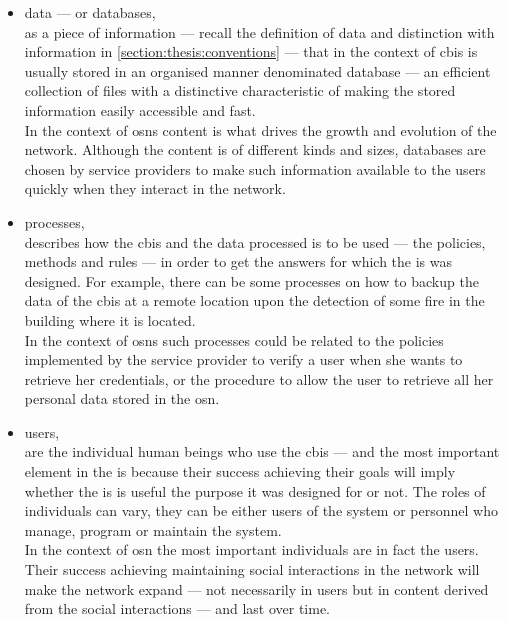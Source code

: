 \begin{itemize}
    \item data --- or databases,\\
    as a piece of information --- recall the definition of data and distinction 
    with information in \cref{section:thesis:conventions} --- that in the context of \ac{cbis}
    is usually stored in an organised manner denominated database --- an efficient 
    collection of files with a distinctive characteristic of making the stored information 
    easily accessible and fast.\\
    In the context of \acp{osn} content is what drives the growth and evolution 
    of the network. Although the content is of different kinds and sizes, databases 
    are chosen by service providers to make such information available to the users 
    quickly when they interact in the network.
    
    \item processes,\\
    describes how the \ac{cbis} and the data processed is to be used --- the policies, 
    methods and rules --- in order to get the answers for which the \ac{is} was 
    designed. For example, there can be some processes on how to backup the data 
    of the \ac{cbis} at a remote location upon the detection of some fire in the 
    building where it is located.\\
    In the context of \acp{osn} such processes could be related to the policies 
    implemented by the service provider to verify a user when she wants to retrieve 
    her credentials, or the procedure to allow the user to retrieve all her personal 
    data stored in the \ac{osn}.
    
    \item users,\\
    are the individual human beings who use the \ac{cbis} --- and the most important 
    element in the \ac{is} because their success achieving their goals will imply 
    whether the \ac{is} is useful the purpose it was designed for or not. The roles 
    of individuals can vary, they can be either users of the system or personnel 
    who manage, program or maintain the system.\\
    In the context of \ac{osn} the most important individuals are in fact the users. 
    Their success achieving maintaining social interactions in the network will 
    make the network expand --- not necessarily in users but in content derived 
    from the social interactions --- and last over time.
    
\end{itemize}

